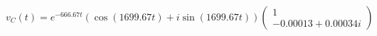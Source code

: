 \documentclass[preview]{standalone}
\begin{document}
\begin{center}
\[
                                        v_C(t) = e^{-666.67t} \left( \cos(1699.67t) + i \sin(1699.67t) \right)
                                        \begin{pmatrix} 
                                        1 \\ 
                                        -0.00013 + 0.00034i 
                                        \end{pmatrix}
                                \]
\end{center}
\end{document}
